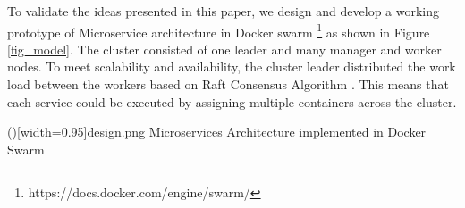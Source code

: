 \documentclass{ieeeaccess}
\begin{document}
To validate the ideas presented in this paper, we design and develop a working prototype of Microservice architecture in Docker swarm \footnote{https://docs.docker.com/engine/swarm/} as shown in Figure \ref{fig_model}. The cluster consisted of one leader and many manager and worker nodes. To meet scalability and availability, the cluster leader distributed the work load between the workers based on Raft Consensus Algorithm \cite{ongaro2015raft}. This means that each service could be executed by assigning multiple containers across the cluster. 

 



 
 
\Figure[!t]()[width=0.95\textwidth]{design.png}
   {Microservices Architecture implemented in Docker Swarm \label{fig_model}}
 
\end{document}
